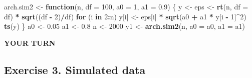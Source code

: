 \documentclass[]{book}
\newenvironment{Shaded}{\begin{snugshade}}{\end{snugshade}}
\newcommand{\KeywordTok}[1]{\textcolor[rgb]{0.13,0.29,0.53}{\textbf{#1}}}
\newcommand{\DataTypeTok}[1]{\textcolor[rgb]{0.13,0.29,0.53}{#1}}
\newcommand{\DecValTok}[1]{\textcolor[rgb]{0.00,0.00,0.81}{#1}}
\newcommand{\FloatTok}[1]{\textcolor[rgb]{0.00,0.00,0.81}{#1}}
\newcommand{\StringTok}[1]{\textcolor[rgb]{0.31,0.60,0.02}{#1}}
\newcommand{\ControlFlowTok}[1]{\textcolor[rgb]{0.13,0.29,0.53}{\textbf{#1}}}
\newcommand{\OperatorTok}[1]{\textcolor[rgb]{0.81,0.36,0.00}{\textbf{#1}}}
\newcommand{\NormalTok}[1]{#1}
\begin{document}
\begin{Shaded}
\begin{Highlighting}[]
\NormalTok{arch.sim2 <-}\StringTok{ }\ControlFlowTok{function}\NormalTok{(n, }\DataTypeTok{df =} \DecValTok{100}\NormalTok{, }\DataTypeTok{a0 =} \DecValTok{1}\NormalTok{, }\DataTypeTok{a1 =} \FloatTok{0.9}\NormalTok{) \{}
\NormalTok{    y <-}\StringTok{ }\NormalTok{eps <-}\StringTok{ }\KeywordTok{rt}\NormalTok{(n, }\DataTypeTok{df =}\NormalTok{ df) }\OperatorTok{*}\StringTok{ }\KeywordTok{sqrt}\NormalTok{((df }\OperatorTok{-}\StringTok{ }\DecValTok{2}\NormalTok{)}\OperatorTok{/}\NormalTok{df)}
    \ControlFlowTok{for}\NormalTok{ (i }\ControlFlowTok{in} \DecValTok{2}\OperatorTok{:}\NormalTok{n) y[i] <-}\StringTok{ }\NormalTok{eps[i] }\OperatorTok{*}\StringTok{ }\KeywordTok{sqrt}\NormalTok{(a0 }\OperatorTok{+}\StringTok{ }\NormalTok{a1 }\OperatorTok{*}\StringTok{ }\NormalTok{y[i }\OperatorTok{-}\StringTok{ }\DecValTok{1}\NormalTok{]}\OperatorTok{^}\DecValTok{2}\NormalTok{)}
    \KeywordTok{ts}\NormalTok{(y)}
\NormalTok{\}}
\NormalTok{a0 <-}\StringTok{ }\FloatTok{0.05}
\NormalTok{a1 <-}\StringTok{ }\FloatTok{0.8}
\NormalTok{n <-}\StringTok{ }\DecValTok{2000}
\NormalTok{y1 <-}\StringTok{ }\KeywordTok{arch.sim2}\NormalTok{(n, }\DataTypeTok{a0 =}\NormalTok{ a0, }\DataTypeTok{a1 =}\NormalTok{ a1)}
\end{Highlighting}
\end{Shaded}

\textbf{YOUR TURN}

\subsection{Exercise 3. Simulated
data}\label{exercise-3.-simulated-data}
\end{document}
